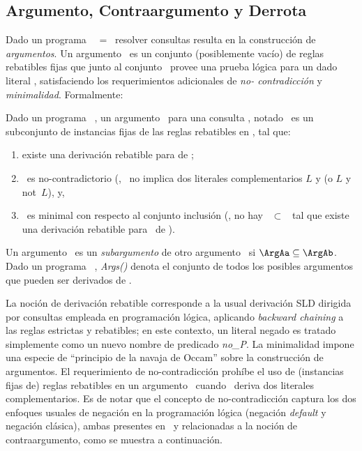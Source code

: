 \subsection{Argumento, Contraargumento y Derrota}
\label{sec:argumento_contraargumento_derrota}

Dado un programa \DLP\ \PP\ = \SD\, resolver consultas resulta en la
construcción de \textit{argumentos}. Un argumento \ArgA\ es un
conjunto (posiblemente vacío) de reglas rebatibles fijas que junto al
conjunto \SSet\  provee una prueba lógica para un dado literal \ArgQ,
satisfaciendo los requerimientos adicionales de  \textit{no-
contradicción} y \textit{minimalidad}. Formalmente:

\begin{definicion}[Argumento]
\label{def:argumento}

Dado un programa \DLP\ \PP, un argumento \ArgA\ para una consulta
\ArgQ, notado \AQ\, es un subconjunto de  instancias fijas de las
reglas rebatibles en \PP, tal que:
	
\begin{enumerate}[(1)]

\item existe una derivación rebatible para \ArgQ de \SyA;

\item \SyA\ es no-contradictorio (\ie, \SyA\ no implica dos literales
complementarios $L$ y  (o $L$ y \textsf{not}\ $L$), y,

\item \ArgA\ es minimal con respecto al conjunto inclusión (\ie, no
hay \Ap\ $\subset$ \ArgA\ tal que existe una derivación rebatible para
\ArgQ\ de \SyAp).

\end{enumerate}
	
\end{definicion}

Un argumento \AaQa\ es un \textit{subargumento} de otro argumento
\AbQb\ si $\ArgAa \subseteq \ArgAb$. Dado un programa \DLP\ \PP,
\textit{Args(\PP)} denota el conjunto de todos los posibles argumentos
que  pueden ser derivados de \PP.

La noción de derivación rebatible corresponde a la usual derivación
SLD dirigida por consultas empleada en programación lógica, aplicando
\textit{backward chaining} a las reglas estrictas y rebatibles; en
este contexto, un literal negado  es tratado simplemente
como un nuevo nombre de predicado \textit{no\_P}. La minimalidad
impone una especie de ``principio de la navaja de Occam'' sobre la
construcción  de argumentos. El requerimiento de no-contradicción
prohíbe el uso de (instancias fijas de) reglas rebatibles en un
argumento \ArgA\ cuando \SyA\ deriva dos literales complementarios. Es
de notar que el concepto de no-contradicción captura los dos enfoques
usuales de negación en la programación lógica (negación
\textit{default} y negación clásica), ambas presentes en \DLP\ y
relacionadas a la noción de contraargumento, como se muestra a
continuación.

